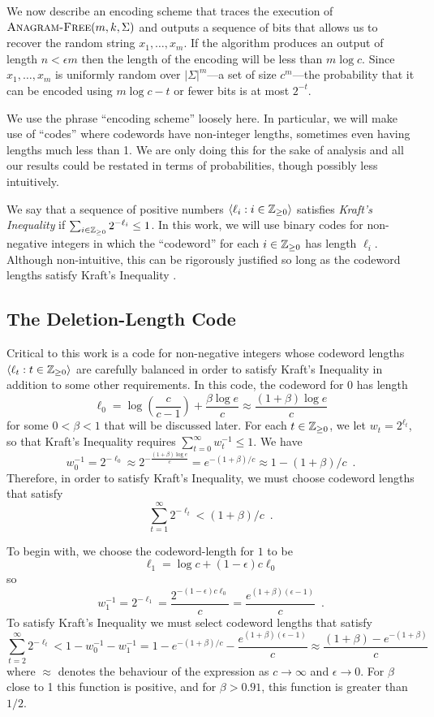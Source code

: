 \documentclass{patmorin}
\begin{document}
We now describe an encoding scheme that traces the execution of $\textsc{Anagram-Free}(m, k, \Sigma)$ and outputs a sequence of bits that allows us to recover the random string $x_1,\ldots,x_m$.  If the algorithm produces an output of length $n < \epsilon m$ then the length of the encoding will be less than $m\log c$.  Since $x_1,\ldots,x_m$ is uniformly random over $|\Sigma|^m$---a set of size $c^m$---the probability that it can be encoded using $m\log c - t$ or fewer bits is at most $2^{-t}$.

We use the phrase ``encoding scheme'' loosely here.  In particular, we will make use of ``codes'' where codewords have non-integer lengths, sometimes even having lengths much less than 1.  We are only doing this for the sake of analysis and all our results could be restated in terms of probabilities, though possibly less intuitively.

We say that a sequence of positive numbers $\langle \ell_i : i\in\mathbb{Z}_{\ge 0}\rangle$ satisfies \emph{Kraft's Inequality} if $\sum_{i\in\mathbb{Z}_{\ge 0}} 2^{-\ell_i} \le 1$.  In this work, we will use binary codes for non-negative integers in which the ``codeword'' for each $i\in\mathbb{Z}_{\ge 0}$ has length $\ell_i$.  Although non-intuitive, this can be rigorously justified so long as the codeword lengths satisfy Kraft's Inequality \cite[Section~7]{morin.mulzer.ea:encoding}.

\subsection{The Deletion-Length Code}

Critical to this work is a code for non-negative integers whose codeword lengths $\langle \ell_t:t\in\mathbb{Z}_{\ge0}\rangle$ are carefully balanced in order to satisfy Kraft's Inequality in addition to some other requirements.  In this code, the codeword for 0 has length
\[
     \ell_0 = \log\left(\frac{c}{c-1}\right)+\frac{\beta\log e}{c}
       \approx \frac{(1+\beta)\log e}{c}
\]
for some $0 < \beta <1$ that will be discussed later.  For each $t\in \mathbb{Z}_{\ge0}$, we let $w_t=2^{\ell_t}$, so that Kraft's Inequality requires $\sum_{t=0}^\infty w_t^{-1} \le 1$.  We have
\[
   w_0^{-1} = 2^{-\ell_0} \approx 2^{-\tfrac{(1+\beta)\log e}{c}} = e^{-(1+\beta)/c} \approx 1-(1+\beta)/c \enspace .
\]
Therefore, in order to satisfy Kraft's Inequality, we must choose codeword lengths that satisfy
\[
   \sum_{t=1}^\infty 2^{-\ell_t} < (1+\beta)/c \enspace .
\]

To begin with, we choose the codeword-length for $1$ to be
\[
    \ell_1 = \log c + (1-\epsilon)c\ell_0
\]
so
\[
    w_1^{-1} = 2^{-\ell_1} 
    = \frac{2^{-(1-\epsilon)c\ell_0}}{c}
    = \frac{e^{(1+\beta)(\epsilon-1)}}{c}  \enspace .
\]
To satisfy Kraft's Inequality we must select codeword lengths that satisfy
\[
    \sum_{t=2}^\infty 2^{-\ell_t} < 1-w_0^{-1}-w_1^{-1}
    = 1-e^{-(1+\beta)/c}-\frac{e^{(1+\beta)(\epsilon-1)}}{c}
    \approx \frac{(1+\beta) - e^{-(1+\beta)}}{c}
\]
where $\approx$ denotes the behaviour of the expression as $c\rightarrow\infty$ and $\epsilon\rightarrow 0$.  For $\beta$ close to 1 this function is positive, and for $\beta>0.91$, this function is greater than $1/2$.
\end{document}
